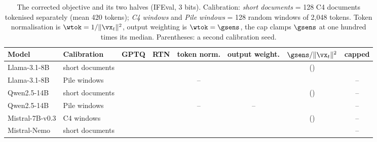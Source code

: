 \begin{table}[t]
\caption{The corrected objective and its two halves (IFEval, 3 bits). Calibration: \emph{short documents} = 128 C4 documents tokenised separately (mean 420 tokens); \emph{C4 windows} and \emph{Pile windows} = 128 random windows of 2,048 tokens. Token normalisation is $\wtok=1/\|\vx_t\|^2$, output weighting is $\wtok=\gsens$, the cap clamps $\gsens$ at one hundred times its median. Parentheses: a second calibration seed.}
\label{tab:ablation}
\begin{center}
\small
\begin{tabular}{llcccccc}
\toprule
Model & Calibration & GPTQ & RTN & token norm. & output weight. & $\gsens/\|\vx_t\|^2$ & capped \\
\midrule
Llama-3.1-8B    & short documents & \LgptqIF{} & \LrtnIF{} & \LtnormIF{} & \LgonlyIF{}     & \LcorrIF{} (\LcorrSeedIF{}) & \LcapIF{} \\
Llama-3.1-8B    & Pile windows    & \LpileIF{} & \LrtnIF{} & --          & \LpileGonlyIF{} & \LpileCorrIF{}              & -- \\
Qwen2.5-14B     & short documents & \QgptqIF{} & \QrtnIF{} & \QtnormIF{} & \QgonlyIF{}     & \QcorrIF{} (\QcorrSeedIF{}) & -- \\
Qwen2.5-14B     & Pile windows    & \QpileIF{} & \QrtnIF{} & --          & --              & \QpileCorrIF{}              & -- \\
Mistral-7B-v0.3 & C4 windows      & \MgptqIF{} & \MrtnIF{} & \MtnormIF{} & \MgonlyIF{}     & \McorrIF{} (\McorrSeedIF{}) & -- \\
Mistral-Nemo    & short documents & \NgptqIF{} & \NrtnIF{} & \NtnormIF{} & \NgonlyIF{}     & \NcorrIF{}                  & -- \\
\bottomrule
\end{tabular}
\end{center}
\end{table}
